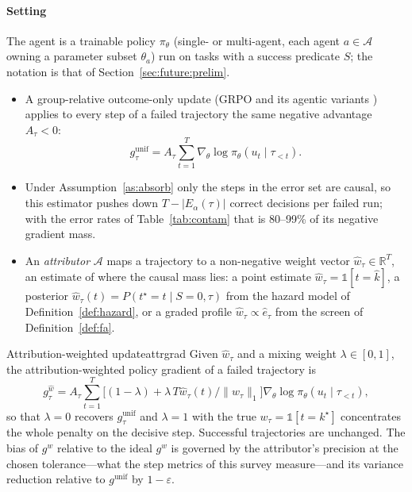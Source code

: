 \paragraph{Setting} The agent is a trainable policy $\pi_\theta$ (single- or multi-agent, each agent $a\in\mathcal{A}$ owning a parameter subset $\theta_a$) run on tasks with a success predicate $S$; the notation is that of Section~\ref{sec:future:prelim}.
\begin{itemize}[leftmargin=1.1em]
\item A group-relative outcome-only update (GRPO and its agentic variants \cite{feng2025gigpo}) applies to every step of a failed trajectory the same negative advantage $A_\tau<0$:
\[g^{\mathrm{unif}}_\tau=A_\tau\sum_{t=1}^{T}\nabla_\theta\log\pi_\theta(u_t\mid\tau_{<t}).\]
\item Under Assumption~\ref{as:absorb} only the steps in the error set are causal, so this estimator pushes down $T-|E_\alpha(\tau)|$ correct decisions per failed run; with the error rates of Table~\ref{tab:contam} that is 80--99\% of its negative gradient mass.
\item An \emph{attributor} $\mathcal{A}$ maps a trajectory to a non-negative weight vector $\hat w_\tau\in\mathbb{R}^T$, an estimate of where the causal mass lies: a point estimate $\hat w_\tau=\mathbb{1}[t=\hat k]$, a posterior $\hat w_\tau(t)=P(t^\star{=}t\mid S{=}0,\tau)$ from the hazard model of Definition~\ref{def:hazard}, or a graded profile $\hat w_\tau\propto\hat e_\tau$ from the screen of Definition~\ref{def:fa}.
\end{itemize}

\begin{definition}{Attribution-weighted update}{attrgrad}
Given $\hat w_\tau$ and a mixing weight $\lambda\in[0,1]$, the attribution-weighted policy gradient of a failed trajectory is
\[g^{\hat w}_\tau=A_\tau\sum_{t=1}^{T}\big[(1-\lambda)+\lambda\,T\hat w_\tau(t)/\|\hat w_\tau\|_1\big]\nabla_\theta\log\pi_\theta(u_t\mid\tau_{<t}),\]
so that $\lambda=0$ recovers $g^{\mathrm{unif}}_\tau$ and $\lambda=1$ with the true $w_\tau=\mathbb{1}[t=k^\star]$ concentrates the whole penalty on the decisive step. Successful trajectories are unchanged. The bias of $g^{\hat w}$ relative to the ideal $g^{w}$ is governed by the attributor's precision at the chosen tolerance---what the step metrics of this survey measure---and its variance reduction relative to $g^{\mathrm{unif}}$ by $1-\varepsilon$.
\end{definition}

